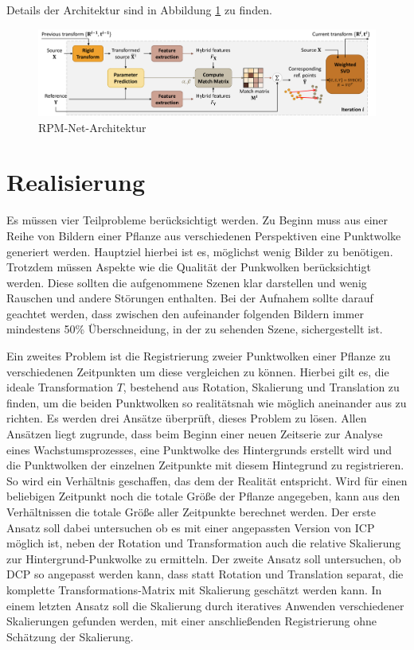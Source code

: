 \documentclass[12pt,titlepage, twoside]{article}
\begin{document}
 Details der Architektur sind in Abbildung \ref{fig:rpm:net:arch} zu finden.

\begin{figure}
    \centering
    \includegraphics[width=1.0\textwidth]{./Images/RPM_Net_Arch.png}
    \caption{RPM-Net-Architektur \cite{Yew_2020}}
    \label{fig:rpm:net:arch}
\end{figure}

\newpage
\section{Realisierung}
\label{sec:realisierung}
Es müssen vier Teilprobleme berücksichtigt werden. Zu Beginn muss aus einer Reihe von Bildern einer Pflanze aus verschiedenen Perspektiven eine Punktwolke generiert werden. 
Hauptziel hierbei ist es, möglichst wenig Bilder zu benötigen. 
Trotzdem müssen Aspekte wie die Qualität der Punkwolken berücksichtigt werden. Diese sollten die aufgenommene Szenen klar darstellen und wenig Rauschen und andere Störungen enthalten. 
Bei der Aufnahem sollte darauf geachtet werden, dass zwischen den aufeinander folgenden Bildern immer mindestens 50\% Überschneidung, in der zu sehenden Szene, sichergestellt ist. 

Ein zweites Problem ist die Registrierung zweier Punktwolken einer Pflanze zu verschiedenen Zeitpunkten um diese vergleichen zu können. 
Hierbei gilt es, die ideale Transformation $T$, bestehend aus Rotation, Skalierung und Translation zu finden, um die beiden Punktwolken so realitätsnah wie möglich aneinander aus zu richten.
Es werden drei Ansätze überprüft, dieses Problem zu lösen. 
Allen Ansätzen liegt zugrunde, dass beim Beginn einer neuen Zeitserie zur Analyse eines Wachstumsprozesses, eine Punktwolke des Hintergrunds erstellt wird und 
die Punktwolken der einzelnen Zeitpunkte mit diesem Hintegrund zu registrieren. So wird ein Verhältnis geschaffen, das dem der Realität entspricht. 
Wird für einen beliebigen Zeitpunkt noch die totale Größe der Pflanze angegeben, kann aus den Verhältnissen die totale Größe aller Zeitpunkte berechnet werden. 
Der erste Ansatz soll dabei untersuchen ob es mit einer angepassten Version von ICP möglich ist, neben der Rotation und Transformation auch die relative Skalierung zur Hintergrund-Punkwolke zu ermitteln.
Der zweite Ansatz soll untersuchen, ob DCP so angepasst werden kann, dass statt Rotation und Translation separat, die komplette Transformations-Matrix mit Skalierung geschätzt werden kann.
In einem letzten Ansatz soll die Skalierung durch iteratives Anwenden verschiedener Skalierungen gefunden werden, mit einer anschließenden Registrierung ohne Schätzung der Skalierung.
\end{document}
